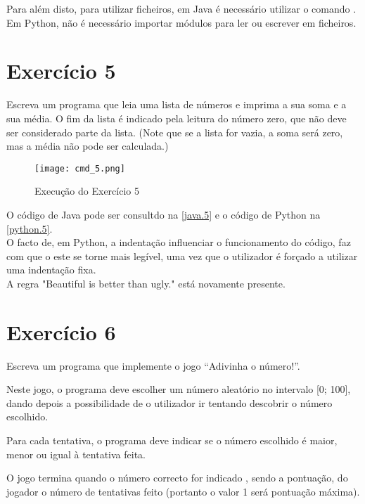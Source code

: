 \documentclass[a4paper]{report}
\begin{document}
Para além disto, para utilizar ficheiros, em Java é necessário utilizar o comando .
\\
Em Python, não é necessário importar módulos para ler ou escrever em ficheiros.


\clearpage

\section{Exercício 5}
\label{exercicio5}

Escreva um programa que leia uma lista de números e imprima a sua soma e a sua média. O fim da lista é indicado pela leitura do número zero, que não deve ser considerado parte da lista. (Note que se a lista for vazia, a soma será zero, mas a média não pode ser calculada.)

\begin{figure}[ht]
 \texttt{[image: cmd\_5.png]}
 \caption{Execução do Exercício 5}
 \label{cmd5}
\end{figure}


O código de Java pode ser consultdo na \autoref{java.5} e o código de Python na \autoref{python.5}.
\\[5pt]
O facto de, em Python, a indentação influenciar o funcionamento do código, faz com que o este se torne mais legível, uma vez que o utilizador é forçado a utilizar uma indentação fixa.
\\[5pt]
A regra "\gls{Beautiful is better than ugly}." está novamente presente.

\clearpage



\section{Exercício 6}
\label{exercicio6}

Escreva um programa que implemente o jogo “Adivinha o número!”.


Neste jogo, o programa deve escolher um número aleatório no intervalo [0; 100], dando depois a possibilidade de o utilizador ir tentando descobrir o número escolhido. 

Para cada tentativa, o programa deve indicar se o número escolhido é maior, menor ou igual à tentativa feita. 

O jogo termina quando o número correcto for indicado , sendo a pontuação, do jogador o número de tentativas feito (portanto o valor 1 será pontuação máxima).
\end{document}
